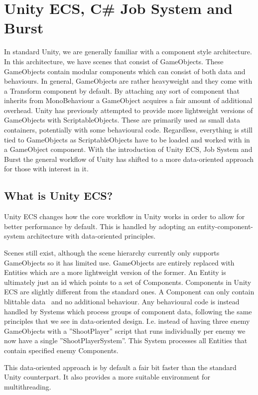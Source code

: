 \section{Unity ECS, C\# Job System and Burst}
In standard Unity, we are generally familiar with a component style architecture. In this architecture, we have scenes that consist of GameObjects. These GameObjects contain modular components which can consist of both data and behaviours. In general, GameObjects are rather heavyweight and they come with a Transform component by default. By attaching any sort of component that inherits from MonoBehaviour a GameObject acquires a fair amount of additional overhead. Unity has previously attempted to provide more lightweight versions of GameObjects with ScriptableObjects. These are primarily used as small data containers, potentially with some behavioural code. Regardless, everything is still tied to GameObjects as ScriptableObjects have to be loaded and worked with in a GameObject component. With the introduction of Unity ECS, Job System and Burst the general workflow of Unity has shifted to a more data-oriented approach for those with interest in it. 

\subsection{What is Unity ECS?}
Unity ECS changes how the core workflow in Unity works in order to allow for better performance by default. This is handled by adopting an entity-component-system architecture with data-oriented principles. 

Scenes still exist, although the scene hierarchy currently only supports GameObjects so it has limited use. GameObjects are entirely replaced with Entities which are a more lightweight version of the former. An Entity is ultimately just an id which points to a set of Components. Components in Unity ECS are slightly different from the standard ones. A Component can only contain blittable data~\cite{blittable} and no additional behaviour. Any behavioural code is instead handled by Systems which process groups of component data, following the same principles that we see in data-oriented design. I.e. instead of having three enemy GameObjects with a ''ShootPlayer'' script that runs individually per enemy we now have a single ''ShootPlayerSystem''. This System processes all Entities that contain specified enemy Components.  

This data-oriented approach is by default a fair bit faster than the standard Unity counterpart. It also provides a more suitable environment for multithreading.

